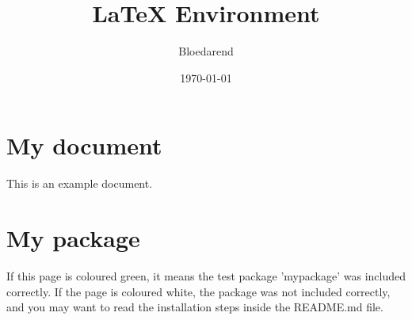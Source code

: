 \documentclass{article}
\title{LaTeX Environment}
\author{Bloedarend}
\date{\today}
\begin{document}
    \maketitle

    \begin{center}
        \section{My document}\label{sec:my-document}
        This is an example document.

        \section{My package}\label{sec:my-package}
        If this page is coloured green, it means the test package 'mypackage' was included correctly.
        If the page is coloured white, the package was not included correctly, and you may want to read the installation steps inside the README.md file.
    \end{center}
\end{document}
